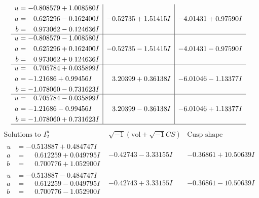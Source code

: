 \documentclass[1p]{elsarticle_modified}
\theoremstyle{definition}
\newcommand{\I}{\sqrt{-1}}
\begin{document}
$$\begin{array}{c|c|c}
\begin{aligned}
u &= -0.808579 + 1.008580 I \\
a &= \phantom{-}0.625296 - 0.162400 I \\
b &= \phantom{-}0.973062 - 0.124636 I\end{aligned}
 & -0.52735 + 1.51415 I & -4.01431 + 0.97590 I \\ \hline\begin{aligned}
u &= -0.808579 - 1.008580 I \\
a &= \phantom{-}0.625296 + 0.162400 I \\
b &= \phantom{-}0.973062 + 0.124636 I\end{aligned}
 & -0.52735 - 1.51415 I & -4.01431 - 0.97590 I \\ \hline\begin{aligned}
u &= \phantom{-}0.705784 + 0.035899 I \\
a &= -1.21686 + 0.99456 I \\
b &= -1.078060 - 0.731623 I\end{aligned}
 & \phantom{-}3.20399 + 0.36138 I & -6.01046 - 1.13377 I \\ \hline\begin{aligned}
u &= \phantom{-}0.705784 - 0.035899 I \\
a &= -1.21686 - 0.99456 I \\
b &= -1.078060 + 0.731623 I\end{aligned}
 & \phantom{-}3.20399 - 0.36138 I & -6.01046 + 1.13377 I\\
 \hline 
 \end{array}$$\newpage$$\begin{array}{c|c|c}  
\text{Solutions to }I^u_{2}& \I (\text{vol} + \sqrt{-1}CS) & \text{Cusp shape}\\
 \hline 
\begin{aligned}
u &= -0.513887 + 0.484747 I \\
a &= \phantom{-}0.612259 + 0.049795 I \\
b &= \phantom{-}0.700776 + 1.052900 I\end{aligned}
 & -0.42743 - 3.33155 I & -0.36861 + 10.50639 I \\ \hline\begin{aligned}
u &= -0.513887 - 0.484747 I \\
a &= \phantom{-}0.612259 - 0.049795 I \\
b &= \phantom{-}0.700776 - 1.052900 I\end{aligned}
 & -0.42743 + 3.33155 I & -0.36861 - 10.50639 I \\ \hline\begin{aligned}

\end{aligned}
\end{array}$$
\end{document}
